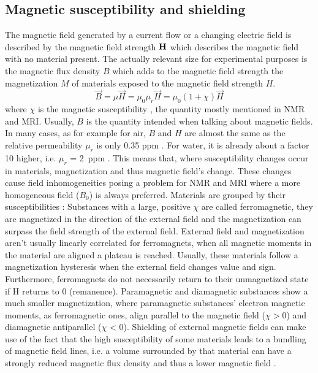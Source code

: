             \subsection{Magnetic susceptibility and shielding}
                The magnetic field generated by a current flow or a changing electric field is described by the magnetic field strength $\mathbf{H}$ which describes the magnetic field with no material present. The actually relevant size for experimental purposes is the magnetic flux density $B$ which adds to the magnetic field strength the magnetization $M$ of materials exposed to the magnetic field strength $H$.
                \begin{equation}
                    \vec{B} = \mu \vec{H} = \mu_0 \mu_r \vec{H} = \mu_0(1+\chi) \vec{H}
                \end{equation}
                where $\chi$ is the magnetic susceptibility \cite{schenck_role_1996}, the quantity mostly mentioned in NMR and MRI. Usually, $B$ is the quantity intended when talking about magnetic fields.
                In many cases, as for example for air, $B$ and $H$ are almost the same as the relative permeability \cite{kriz_magnetic_1996} $\mu_r$ is only 0.35 ppm \cite{cullity_introduction_2008}. For water, it is already about a factor 10 higher, i.e. $\mu_r$ = 2~ppm . 
                This means that, where susceptibility changes occur in materials, magnetization and thus magnetic field's change. These changes cause field inhomogeneities posing a problem for NMR and MRI where a more homogeneous field ($B_0$) is always preferred. Materials are grouped by their susceptibilities \cite{b.i._bleaney__b._bleaney_electricity_nodate}:
                Substances with a large, positive $\chi$ are called ferromagnetic, they are magnetized in the direction of the external field and the magnetization can surpass the field strength of the external field. External field and magnetization aren't usually linearly correlated for ferromagnets, when all magnetic moments in the material are aligned a plateau is reached. Usually, these materials follow a magnetization hysteresis when the external field changes value and sign. Furthermore, ferromagnets do not necessarily return to their unmagnetized state if H returns to 0 (remanence).
                Paramagnetic and diamagnetic substances show a much smaller magnetization, where paramagnetic substances' electron magnetic moments, as ferromagnetic ones, align parallel to the magnetic field ($\chi>0$) and diamagnetic antiparallel ($\chi$ < 0).
                Shielding of external magnetic fields can make use of the fact that the high susceptibility of some materials leads to a bundling of magnetic field lines, i.e. a volume surrounded by that material can have a strongly reduced magnetic flux density and thus a lower magnetic field \cite{mager_magnetic_1970}.
